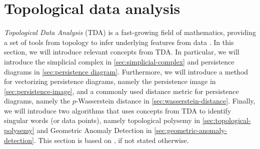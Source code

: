 \section{Topological data analysis}
\label{sec:topological-data-analysis}
\textit{Topological Data Analysis} (TDA) is a fast-growing field of mathematics, providing a set of tools from topology to infer underlying features from data \cite{chazal2021introduction}. In this section, we will introduce relevant concepts from TDA. In particular, we will introduce the simplicial complex in \cref{sec:simplicial-complex} and persistence diagrams in \cref{sec:persistence diagram}. Furthermore, we will introduce a method for vectorizing persistence diagrams, namely the persistence image in \cref{sec:persistence-image}, and a commonly used distance metric for persistence diagrams, namely the $p$-Wasserstein distance in \cref{sec:wasserstein-distance}. Finally, we will introduce two algorithms that uses concepts from TDA to identify singular words (or data points), namely topological polysemy in \cref{sec:topological-polysemy} and Geometric Anomaly Detection in \cref{sec:geometric-anomaly-detection}. This section is based on \cites{Edelsbrunner2010}{chazal2021introduction}, if not stated otherwise.

